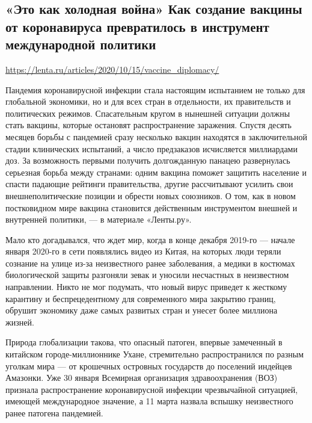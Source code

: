  
 

\subsection{«Это как холодная война» Как создание вакцины от коронавируса
превратилось в инструмент международной политики}

\url{https://lenta.ru/articles/2020/10/15/vaccine_diplomacy/}

Пандемия коронавирусной инфекции стала настоящим испытанием не только для
глобальной экономики, но и для всех стран в отдельности, их правительств и
политических режимов. Спасательным кругом в нынешней ситуации должны стать
вакцины, которые остановят распространение заражения. Спустя десять месяцев
борьбы с пандемией сразу несколько вакцин находятся в заключительной стадии
клинических испытаний, а число предзаказов исчисляется миллиардами доз. За
возможность первыми получить долгожданную панацею развернулась серьезная борьба
между странами: одним вакцина поможет защитить население и спасти падающие
рейтинги правительства, другие рассчитывают усилить свои внешнеполитические
позиции и обрести новых союзников. О том, как в новом постковидном мире вакцина
становится действенным инструментом внешней и внутренней политики, --- в
материале «Ленты.ру».

Мало кто догадывался, что ждет мир, когда в конце декабря 2019-го --- начале
января 2020-го в сети появлялись видео из Китая, на которых люди теряли
сознание на улице из-за неизвестного ранее заболевания, а медики в костюмах
биологической защиты разгоняли зевак и уносили несчастных в неизвестном
направлении. Никто не мог подумать, что новый вирус приведет к жесткому
карантину и беспрецедентному для современного мира закрытию границ, обрушит
экономику даже самых развитых стран и унесет более миллиона жизней.

Природа глобализации такова, что опасный патоген, впервые замеченный в
китайском городе-миллионнике Ухане, стремительно распространился по разным
уголкам мира --- от крошечных островных государств до поселений индейцев
Амазонки. Уже 30 января Всемирная организация здравоохранения (ВОЗ) признала
распространение коронавирусной инфекции чрезвычайной ситуацией, имеющей
международное значение, а 11 марта назвала вспышку неизвестного ранее патогена
пандемией.

